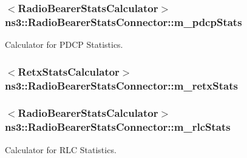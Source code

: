 \subsubsection[{\texorpdfstring{m\+\_\+pdcp\+Stats}{m_pdcpStats}}]{$<${\bf Radio\+Bearer\+Stats\+Calculator}$>$ ns3\+::\+Radio\+Bearer\+Stats\+Connector\+::m\+\_\+pdcp\+Stats\hspace{0.3cm}{\ttfamily [private]}}\hypertarget{classns3_1_1RadioBearerStatsConnector_a984690769317e9eddba15e49170f10d9}{}\label{classns3_1_1RadioBearerStatsConnector_a984690769317e9eddba15e49170f10d9}


Calculator for P\+D\+CP Statistics. 

\subsubsection[{\texorpdfstring{m\+\_\+retx\+Stats}{m_retxStats}}]{$<${\bf Retx\+Stats\+Calculator}$>$ ns3\+::\+Radio\+Bearer\+Stats\+Connector\+::m\+\_\+retx\+Stats\hspace{0.3cm}{\ttfamily [private]}}\hypertarget{classns3_1_1RadioBearerStatsConnector_ad6d3ef18f579f2da0e2bee4f1850e205}{}\label{classns3_1_1RadioBearerStatsConnector_ad6d3ef18f579f2da0e2bee4f1850e205}
\subsubsection[{\texorpdfstring{m\+\_\+rlc\+Stats}{m_rlcStats}}]{$<${\bf Radio\+Bearer\+Stats\+Calculator}$>$ ns3\+::\+Radio\+Bearer\+Stats\+Connector\+::m\+\_\+rlc\+Stats\hspace{0.3cm}{\ttfamily [private]}}\hypertarget{classns3_1_1RadioBearerStatsConnector_a25b5370b25e598c40f5d40d845ca072b}{}\label{classns3_1_1RadioBearerStatsConnector_a25b5370b25e598c40f5d40d845ca072b}


Calculator for R\+LC Statistics. 

